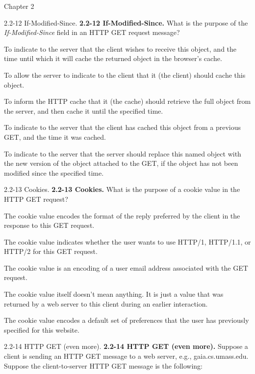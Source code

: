 \documentclass[a4paper]{article}
\begin{document}
\begin{quiz}{Chapter 2}
\begin{multi}[points=1,shuffle]{2.2-12 If-Modified-Since.}
\textbf{2.2-12 If-Modified-Since.} 
What is the purpose of the \emph{If-Modified-Since} field in an HTTP GET request message?
\item To indicate to the server that the client wishes to receive this object, and the time until which it will cache the returned object in the browser's cache.
\item To allow the server to indicate to the client that it (the client) should cache this object.
\item To inform the HTTP cache that it (the cache) should retrieve the full object from the server, and then cache it until the specified time.
\item* To indicate to the server that the client has cached this object from a previous GET, and the time it was cached.
\item To indicate to the server that the server should replace this named object with the new version of the object attached to the GET, if the object has not been modified since the specified time.
\end{multi}

\begin{multi}[points=1,shuffle]{2.2-13 Cookies.}
\textbf{2.2-13 Cookies.} What is the purpose of a cookie value in the HTTP GET request?
\item The cookie value encodes the format of the reply preferred by the client in the response to this GET request.
\item The cookie value indicates whether the user wants to use HTTP/1, HTTP/1.1, or HTTP/2 for this GET request.
\item The cookie value is an encoding of a user email address associated with the GET request.
\item* The cookie value itself doesn't mean anything. It is just a value that was returned by a web server to this client during an earlier interaction.
\item The cookie value encodes a default set of preferences that the user has previously specified for this website.
\end{multi}

\begin{multi}[points=1,shuffle]{2.2-14 HTTP GET (even more).}
\textbf{2.2-14 HTTP GET (even more).} 
Suppose a client is sending an HTTP GET message to a web server, e.g., gaia.cs.umass.edu. 
Suppose the client-to-server HTTP GET message is the following: \\


\end{multi}
\end{quiz}
\end{document}
